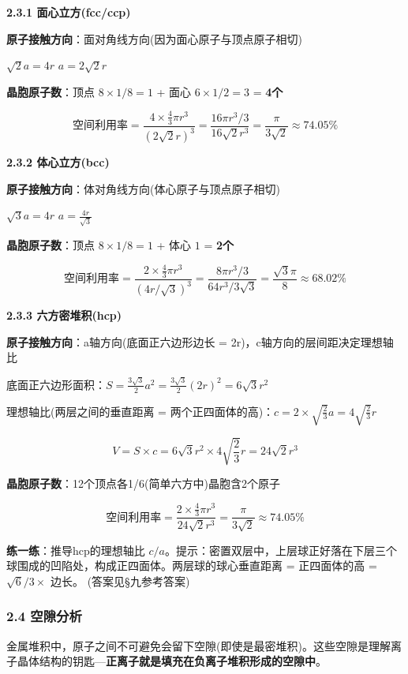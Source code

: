\textbf{2.3.1 面心立方(fcc/ccp)}

\textbf{原子接触方向}：面对角线方向(因为面心原子与顶点原子相切)

\(\sqrt{2}a = 4r\) \箭 \(a = 2\sqrt{2}r\)

\textbf{晶胞原子数}：顶点 \(8 \times 1/8 = 1\) + 面心 \(6 \times 1/2 = 3\) = \textbf{4个}

\[
\text{空间利用率} = \frac{4 \times \frac{4}{3}\pi r^3}{(2\sqrt{2}r)^3} = \frac{16\pi r^3 / 3}{16\sqrt{2}r^3} = \frac{\pi}{3\sqrt{2}} \approx 74.05\%
\]

\textbf{2.3.2 体心立方(bcc)}

\textbf{原子接触方向}：体对角线方向(体心原子与顶点原子相切)

\(\sqrt{3}a = 4r\) \箭 \(a = \frac{4r}{\sqrt{3}}\)

\textbf{晶胞原子数}：顶点 \(8 \times 1/8 = 1\) + 体心 \(1\) = \textbf{2个}

\[
\text{空间利用率} = \frac{2 \times \frac{4}{3}\pi r^3}{(4r/\sqrt{3})^3} = \frac{8\pi r^3 / 3}{64r^3 / 3\sqrt{3}} = \frac{\sqrt{3}\pi}{8} \approx 68.02\%
\]

\textbf{2.3.3 六方密堆积(hcp)}

\textbf{原子接触方向}：a轴方向(底面正六边形边长 = 2r)，c轴方向的层间距决定理想轴比

底面正六边形面积：\(S = \frac{3\sqrt{3}}{2}a^2 = \frac{3\sqrt{3}}{2}(2r)^2 = 6\sqrt{3}r^2\)

理想轴比(两层之间的垂直距离 = 两个正四面体的高)：\(c = 2 \times \sqrt{\frac{2}{3}}a = 4\sqrt{\frac{2}{3}}r\)

\[
V = S \times c = 6\sqrt{3}r^2 \times 4\sqrt{\frac{2}{3}}r = 24\sqrt{2}r^3
\]

\textbf{晶胞原子数}：12个顶点各1/6(简单六方中)\箭 晶胞含2个原子

\[
\text{空间利用率} = \frac{2 \times \frac{4}{3}\pi r^3}{24\sqrt{2}r^3} = \frac{\pi}{3\sqrt{2}} \approx 74.05\%
\]

\textbf{练一练}：推导hcp的理想轴比 \(c/a\)。提示：密置双层中，上层球正好落在下层三个球围成的凹陷处，构成正四面体。两层球的球心垂直距离 = 正四面体的高 = \(\sqrt{6}/3 \times\) 边长。
(答案见§九参考答案)

\subsubsection{2.4 空隙分析}\label{ux7a7aux9699ux5206ux6790}

金属堆积中，原子之间不可避免会留下空隙(即使是最密堆积)。这些空隙是理解离子晶体结构的钥匙---\textbf{正离子就是填充在负离子堆积形成的空隙中}。

